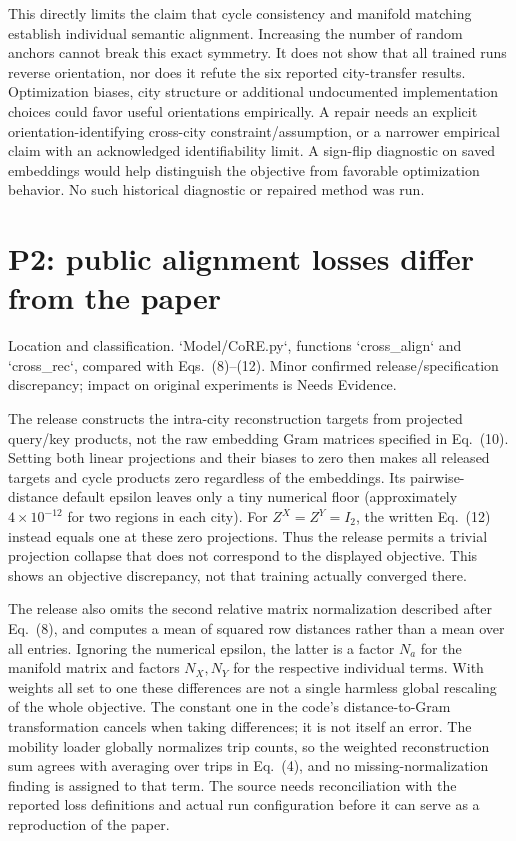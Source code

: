 \documentclass[10pt]{article}
\begin{document}
This directly limits the claim that cycle consistency and manifold matching establish individual semantic alignment. Increasing the number of random anchors cannot break this exact symmetry. It does not show that all trained runs reverse orientation, nor does it refute the six reported city-transfer results. Optimization biases, city structure or additional undocumented implementation choices could favor useful orientations empirically. A repair needs an explicit orientation-identifying cross-city constraint/assumption, or a narrower empirical claim with an acknowledged identifiability limit. A sign-flip diagnostic on saved embeddings would help distinguish the objective from favorable optimization behavior. No such historical diagnostic or repaired method was run.\par
\section*{P2: public alignment losses differ from the paper}
Location and classification. `Model/CoRE.py`, functions `cross\_align` and `cross\_rec`, compared with Eqs. (8)–(12). Minor confirmed release/specification discrepancy; impact on original experiments is Needs Evidence.\par
The release constructs the intra-city reconstruction targets from projected query/key products, not the raw embedding Gram matrices specified in Eq. (10). Setting both linear projections and their biases to zero then makes all released targets and cycle products zero regardless of the embeddings. Its pairwise-distance default epsilon leaves only a tiny numerical floor (approximately \(4\times10^{-12}\) for two regions in each city). For \(Z^X=Z^Y=I_2\), the written Eq. (12) instead equals one at these zero projections. Thus the release permits a trivial projection collapse that does not correspond to the displayed objective. This shows an objective discrepancy, not that training actually converged there.\par
The release also omits the second relative matrix normalization described after Eq. (8), and computes a mean of squared row distances rather than a mean over all entries. Ignoring the numerical epsilon, the latter is a factor \(N_a\) for the manifold matrix and factors \(N_X,N_Y\) for the respective individual terms. With weights all set to one these differences are not a single harmless global rescaling of the whole objective. The constant one in the code’s distance-to-Gram transformation cancels when taking differences; it is not itself an error. The mobility loader globally normalizes trip counts, so the weighted reconstruction sum agrees with averaging over trips in Eq. (4), and no missing-normalization finding is assigned to that term. The source needs reconciliation with the reported loss definitions and actual run configuration before it can serve as a reproduction of the paper.\par
\end{document}
